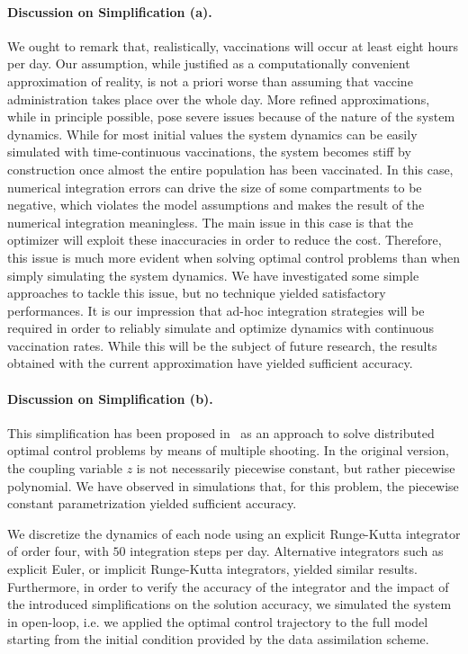\paragraph{Discussion on Simplification (a).}
We ought to remark that, realistically, vaccinations will occur at least eight hours per day. Our assumption, while justified as a computationally convenient approximation of reality, is not a priori worse than assuming that vaccine administration takes place over the whole day. More refined approximations, while in principle possible, pose severe issues because of the nature of the system dynamics. While for most initial values the system dynamics can be easily simulated with time-continuous vaccinations, the system becomes stiff by construction once almost the entire population has been vaccinated. In this case, numerical integration errors can drive the size of some compartments to be negative, which violates the model assumptions and makes the result of the numerical integration meaningless. The main issue in this case is that the optimizer will exploit these inaccuracies in order to reduce the cost. Therefore, this issue is much more evident when solving optimal control problems than when simply simulating the system dynamics. We have investigated some simple approaches to tackle this issue, but no technique yielded satisfactory performances. It is our impression that ad-hoc integration strategies will be required in order to reliably simulate and optimize dynamics with continuous vaccination rates. While this will be the subject of future research, the results obtained with the current approximation have yielded sufficient accuracy.

\paragraph{Discussion on Simplification (b).}
This simplification has been proposed in~\cite{Savorgnan:MultipleShootingDistributed:2011} as an approach to solve distributed optimal control problems by means of multiple shooting. In the original version, the coupling variable $z$ is not necessarily piecewise constant, but rather piecewise polynomial. We have observed in simulations that, for this problem, the piecewise constant parametrization yielded sufficient accuracy.

We discretize the dynamics of each node using an explicit Runge-Kutta integrator of order four, with $50$ integration steps per day. Alternative integrators such as explicit Euler, or implicit Runge-Kutta integrators, yielded similar results. Furthermore, in order to verify the accuracy of the integrator and the impact of the introduced simplifications on the solution accuracy, we simulated the system in open-loop, i.e. we applied the optimal control trajectory to the full model starting from the initial condition provided by the data assimilation scheme.

